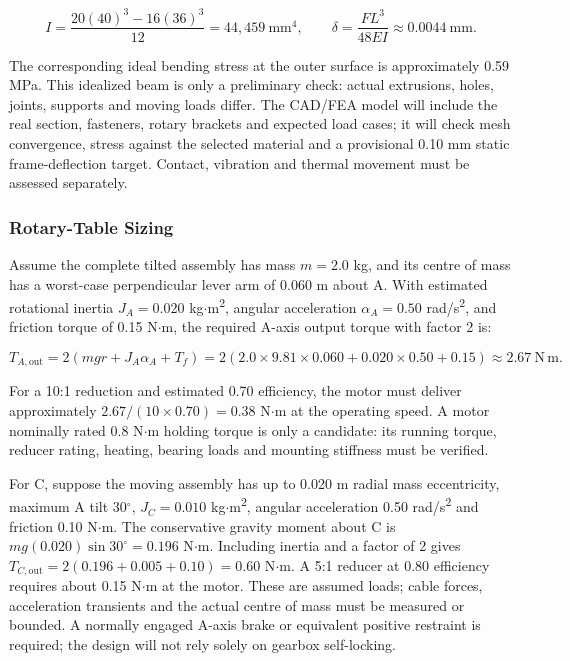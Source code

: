 \documentclass[12pt,a4paper]{article}
\begin{document}
\[
I=\frac{20(40)^3-16(36)^3}{12}=44{,}459\ \mathrm{mm^4}, \qquad
\delta=\frac{FL^3}{48EI}\approx 0.0044\ \mathrm{mm}.
\]

The corresponding ideal bending stress at the outer surface is approximately 0.59 MPa. This idealized
  beam is only a preliminary check: actual extrusions, holes, joints, supports and moving loads differ.
  The CAD/FEA model will include the real section, fasteners, rotary brackets and expected load cases; it
  will check mesh convergence, stress against the selected material and a provisional 0.10 mm static
  frame-deflection target. Contact, vibration and thermal movement must be assessed separately.

\subsubsection{Rotary-Table Sizing}\label{rotary-table-sizing}

Assume the complete tilted assembly has mass \(m=2.0\) kg, and its centre of mass has a worst-case
  perpendicular lever arm of 0.060 m about A. With estimated rotational inertia \(J_A=0.020\)
  kg\ensuremath{\cdot}m\textsuperscript{2}, angular acceleration \(\alpha_A=0.50\)
  rad/s\textsuperscript{2}, and friction torque of 0.15 N\ensuremath{\cdot}m, the required A-axis output
  torque with factor 2 is:

\[
T_{A,\mathrm{out}}=2(mgr+J_A\alpha_A+T_f)
=2(2.0\times9.81\times0.060+0.020\times0.50+0.15)
\approx 2.67\ \mathrm{N\,m}.
\]

For a 10:1 reduction and estimated 0.70 efficiency, the motor must deliver approximately
  \(2.67/(10\times0.70)=0.38\) N\ensuremath{\cdot}m at the operating speed. A motor nominally rated 0.8
  N\ensuremath{\cdot}m holding torque is only a candidate: its running torque, reducer rating, heating,
  bearing loads and mounting stiffness must be verified.

For C, suppose the moving assembly has up to 0.020 m radial mass eccentricity, maximum A tilt
  30\ensuremath{^\circ}, \(J_C=0.010\) kg\ensuremath{\cdot}m\textsuperscript{2}, angular acceleration
  0.50 rad/s\textsuperscript{2} and friction 0.10 N\ensuremath{\cdot}m. The conservative gravity moment
  about C is \(mg(0.020)\sin30^\circ=0.196\) N\ensuremath{\cdot}m. Including inertia and a factor of 2
  gives \(T_{C,\mathrm{out}}=2(0.196+0.005+0.10)=0.60\) N\ensuremath{\cdot}m. A 5:1 reducer at 0.80
  efficiency requires about 0.15 N\ensuremath{\cdot}m at the motor. These are assumed loads; cable
  forces, acceleration transients and the actual centre of mass must be measured or bounded. A normally
  engaged A-axis brake or equivalent positive restraint is required; the design will not rely solely on
  gearbox self-locking.
\end{document}
